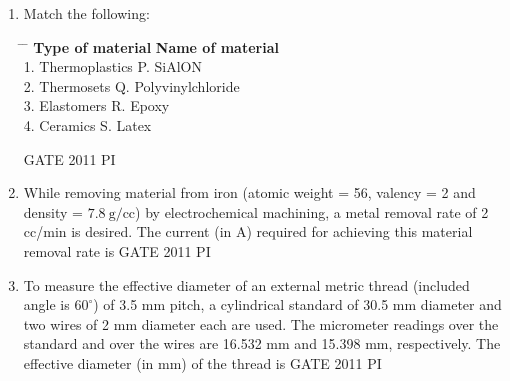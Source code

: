 \documentclass[journal,12pt,onecolumn]{IEEEtran}
\theoremstyle{remark}
\begin{document}
\begin{enumerate}
\item
Match the following:

\begin{tabbing}
    \hspace{6cm} \= \hspace{4cm} \= \kill
    \textbf{Type of material} \> \textbf{Name of material} \\[6pt]
    1. Thermoplastics \> P. SiAlON \\
    2. Thermosets \> Q. Polyvinylchloride \\
    3. Elastomers \> R. Epoxy \\
    4. Ceramics \> S. Latex \\
\end{tabbing}
\hfill{GATE 2011 PI}
\begin{enumerate}
\end{enumerate}
\item
While removing material from iron (atomic weight = 56, valency = 2 and density = $7.8~\text{g/cc}$) by electrochemical machining, a metal removal rate of 2 cc/min is desired. The current (in A) required for achieving this material removal rate is
\hfill{GATE 2011 PI}
\begin{enumerate}
\end{enumerate}

\item
To measure the effective diameter of an external metric thread (included angle is $60^\circ$) of 3.5 mm pitch, a cylindrical standard of 30.5 mm diameter and two wires of 2 mm diameter each are used. The micrometer readings over the standard and over the wires are 16.532 mm and 15.398 mm, respectively. The effective diameter (in mm) of the thread is
\hfill{GATE 2011 PI}
\begin{enumerate}
\end{enumerate}


\end{enumerate}
\end{document}
